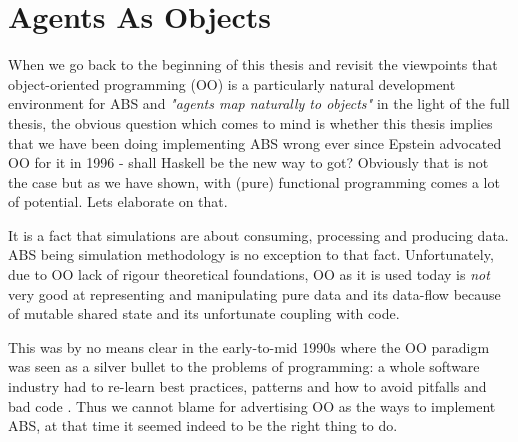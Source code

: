 \chapter{Agents As Objects}
When we go back to the beginning of this thesis and revisit the viewpoints that object-oriented programming (OO) is a particularly natural development environment for ABS \cite{epstein_growing_1996} and \textit{"agents map naturally to objects"} \cite{north_managing_2007} in the light of the full thesis, the obvious question which comes to mind is whether this thesis implies that we have been doing implementing ABS wrong ever since Epstein advocated OO for it in 1996 - shall Haskell be the new way to got? Obviously that is not the case but as we have shown, with (pure) functional programming comes a lot of potential. Lets elaborate on that.

\medskip

It is a fact that simulations are about consuming, processing and producing data. ABS being simulation methodology is no exception to that fact. Unfortunately, due to OO lack of rigour theoretical foundations, OO as it is used today is \textit{not} very good at representing and manipulating pure data and its data-flow because of mutable shared state and its unfortunate coupling with code. 
%
%
%	 
%	

This was by no means clear in the early-to-mid 1990s where the OO paradigm was seen as a silver bullet to the problems of programming: a whole software industry had to re-learn best practices, patterns \cite{gamma_design_1994} and how to avoid pitfalls and bad code \cite{fowler_refactoring:_2012}. Thus we cannot blame \cite{epstein_growing_1996} for advertising OO as the ways to implement ABS, at that time it seemed indeed to be the right thing to do. 

